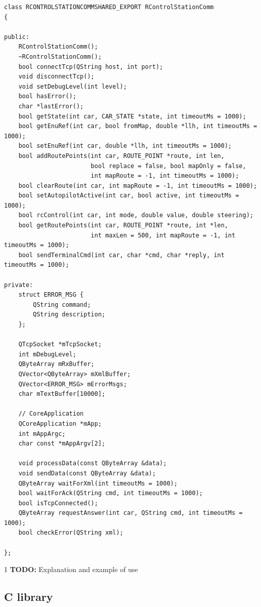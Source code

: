 \documentclass[12pt]{article} %
\def\printtodos{0}
\newcommand{\todo}[1]{
  \if\printtodos1
      {\color{red} \textbf{TODO:} #1}
  \fi}
\begin{document}
\begin{Verbatim}
class RCONTROLSTATIONCOMMSHARED_EXPORT RControlStationComm
{

public:
    RControlStationComm();
    ~RControlStationComm();
    bool connectTcp(QString host, int port);
    void disconnectTcp();
    void setDebugLevel(int level);
    bool hasError();
    char *lastError();
    bool getState(int car, CAR_STATE *state, int timeoutMs = 1000);
    bool getEnuRef(int car, bool fromMap, double *llh, int timeoutMs = 1000);
    bool setEnuRef(int car, double *llh, int timeoutMs = 1000);
    bool addRoutePoints(int car, ROUTE_POINT *route, int len,
                        bool replace = false, bool mapOnly = false,
                        int mapRoute = -1, int timeoutMs = 1000);
    bool clearRoute(int car, int mapRoute = -1, int timeoutMs = 1000);
    bool setAutopilotActive(int car, bool active, int timeoutMs = 1000);
    bool rcControl(int car, int mode, double value, double steering);
    bool getRoutePoints(int car, ROUTE_POINT *route, int *len,
                        int maxLen = 500, int mapRoute = -1, int timeoutMs = 1000);
    bool sendTerminalCmd(int car, char *cmd, char *reply, int timeoutMs = 1000);

private:
    struct ERROR_MSG {
        QString command;
        QString description;
    };

    QTcpSocket *mTcpSocket;
    int mDebugLevel;
    QByteArray mRxBuffer;
    QVector<QByteArray> mXmlBuffer;
    QVector<ERROR_MSG> mErrorMsgs;
    char mTextBuffer[10000];

    // CoreApplication
    QCoreApplication *mApp;
    int mAppArgc;
    char const *mAppArgv[2];

    void processData(const QByteArray &data);
    void sendData(const QByteArray &data);
    QByteArray waitForXml(int timeoutMs = 1000);
    bool waitForAck(QString cmd, int timeoutMs = 1000);
    bool isTcpConnected();
    QByteArray requestAnswer(int car, QString cmd, int timeoutMs = 1000);
    bool checkError(QString xml);

};
\end{Verbatim}

\todo{Explanation and example of use} 


\subsection{C library}
\end{document}
